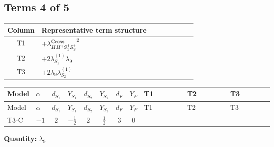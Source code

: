 \documentclass[8pt]{article}
\begin{document}
\begin{landscape}
\subsection*{Terms 4 of 5}
\begin{center}
\begin{tabular}{@{}c >{\raggedright\arraybackslash}p{0.82\linewidth}@{}}
\toprule
Column & Representative term structure \\
\midrule
T1 & \(\displaystyle +{\lambda_{H H^\dagger S_1^\dagger S_2^\dagger}^{\rm Cross}}^2\) \\
\midrule
T2 & \(\displaystyle +2 {\lambda_{S_1}^{(1)}} {\lambda_{9}}\) \\
\midrule
T3 & \(\displaystyle +2 {\lambda_{9}} {\lambda_{S_2}^{(1)}}\) \\
\midrule
\bottomrule
\end{tabular}
\end{center}
\smallskip
\tiny
\begin{longtable}{@{}llcccccc >{\raggedright\arraybackslash}p{0.21\linewidth} >{\raggedright\arraybackslash}p{0.21\linewidth} >{\raggedright\arraybackslash}p{0.21\linewidth}@{}}
\toprule
Model & $\alpha$ & $d_{S_1}$ & $Y_{S_1}$ & $d_{S_2}$ & $Y_{S_2}$ & $d_F$ & $Y_F$ & T1 & T2 & T3 \\
\midrule
\endfirsthead
\toprule
Model & $\alpha$ & $d_{S_1}$ & $Y_{S_1}$ & $d_{S_2}$ & $Y_{S_2}$ & $d_F$ & $Y_F$ & T1 & T2 & T3 \\
\midrule
\endhead
T3-C & $-1$ & $2$ & $-\frac{1}{2}$ & $2$ & $\frac{1}{2}$ & $3$ & $0$ & \scriptsize\adjustbox{max width=\linewidth}{$\begin{gathered} +{\lambda_{H H^\dagger S_1^\dagger S_2^\dagger}^{\rm Cross}}^2\end{gathered}$} & \scriptsize\adjustbox{max width=\linewidth}{$\begin{gathered} +2 {\lambda_{S_1}^{(1)}} {\lambda_{9}}\end{gathered}$} & \scriptsize\adjustbox{max width=\linewidth}{$\begin{gathered} +2 {\lambda_{9}} {\lambda_{S_2}^{(1)}}\end{gathered}$} \\
\midrule
\bottomrule
\end{longtable}
\clearpage
\noindent\textbf{Quantity: }$\lambda_{9}$\par\smallskip

\end{landscape}
\end{document}
